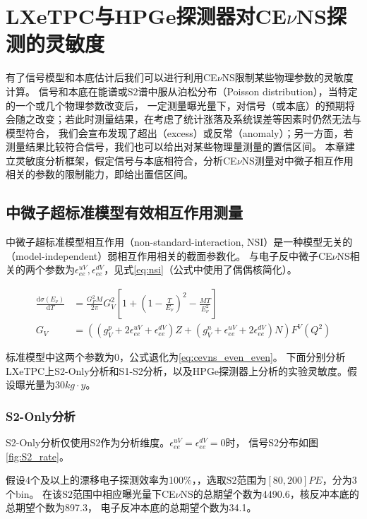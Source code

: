 
\chapter{LXeTPC与HPGe探测器对CE$\nu$NS探测的灵敏度}
\label{sec:sensitivity}

有了信号模型和本底估计后我们可以进行利用CE$\nu$NS限制某些物理参数的灵敏度计算。
信号和本底在能谱或$\mathrm{S2}$谱中服从泊松分布（Poisson distribution），当特定的一个或几个物理参数改变后，
一定测量曝光量下，对信号（或本底）的预期将会随之改变；若此时测量结果，在考虑了统计涨落及系统误差等因素时仍然无法与模型符合，
我们会宣布发现了超出（excess）或反常（anomaly）；另一方面，若测量结果比较符合信号，我们也可以给出对某些物理量测量的置信区间。
本章建立灵敏度分析框架，假定信号与本底相符合，分析CE$\nu$NS测量对中微子相互作用相关的参数的限制能力，即给出置信区间。

\section{中微子超标准模型有效相互作用测量}

中微子超标准模型相互作用（non-standard-interaction, NSI）是一种模型无关的（model-independent）弱相互作用相关的截面参数化\cite{barranco_probing_2005}。
与电子反中微子CE$\nu$NS相关的两个参数为$\epsilon_{ee}^{uV},\epsilon_{ee}^{dV}$，见式\ref{eq:nsi}（公式中使用了偶偶核简化）。

\begin{align}
    \label{eq:nsi}
    \frac{\mathrm{d}\sigma(E_\nu)}{\mathrm{d}T} &= \frac{G_F^2 M}{2\pi}G_V^2\left[1+(1-\frac{T}{E_{\nu}})^2-\frac{MT}{E_{\nu}^2}\right] \\
    G_V &= ((g_V^p+2\epsilon_{ee}^{uV}+\epsilon_{ee}^{dV})Z+(g_V^n+\epsilon_{ee}^{uV}+2\epsilon_{ee}^{dV})N)F^V(Q^2)
\end{align}

标准模型中这两个参数为0，公式退化为\ref{eq:cevns_even_even}。
下面分别分析LXeTPC上S2-Only分析和S1-S2分析，以及HPGe探测器上分析的实验灵敏度。假设曝光量为$30\si{kg\cdot y}$。

\subsection{S2-Only分析}

S2-Only分析仅使用$\mathrm{S2}$作为分析维度。$\epsilon_{ee}^{uV}=\epsilon_{ee}^{dV}=0$时，
信号$\mathrm{S2}$分布如图\ref{fig:S2_rate}。

假设4个及以上的漂移电子探测效率为100\%，，选取$\mathrm{S2}$范围为$[80, 200]\si{PE}$，分为3个bin。
在该$\mathrm{S2}$范围中相应曝光量下CE$\nu$NS的总期望个数为4490.6，核反冲本底的总期望个数为897.3，
电子反冲本底的总期望个数为34.1。

